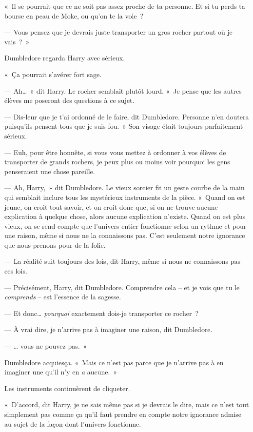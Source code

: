 «~Il se pourrait que ce ne soit pas assez proche de ta personne.
Et si tu perds ta bourse en peau de Moke, ou qu'on te la vole~?

--- Vous pensez que je devrais juste transporter un gros rocher partout où je vais~?~»

Dumbledore regarda Harry avec sérieux.

«~Ça pourrait s'avérer fort sage.

--- Ah…~» dit Harry.
Le rocher semblait plutôt lourd.
«~Je pense que les autres élèves me poseront des questions à ce sujet.

--- Dis-leur que je t'ai ordonné de le faire, dit Dumbledore.
Personne n'en doutera puisqu'ils pensent tous que je suis fou.~»
Son visage était toujours parfaitement sérieux.

--- Euh, pour être honnête, si vous vous mettez à ordonner à vos élèves de transporter de grands rochers, je peux plus ou moins voir pourquoi les gens penseraient une chose pareille.

--- Ah, Harry,~» dit Dumbledore.
Le vieux sorcier fit un geste courbe de la main qui semblait inclure tous les mystérieux instruments de la pièce.
«~Quand on est jeune, on croit tout savoir, et on croit donc que, si on ne trouve aucune explication à quelque chose, alors aucune explication n'existe.
Quand on est plus vieux, on se rend compte que l'univers entier fonctionne selon un rythme et pour une raison, même si nous ne la connaissons pas.
C'est seulement notre ignorance que nous prenons pour de la folie.

--- La réalité suit toujours des lois, dit Harry, même si nous ne connaissons pas ces lois.

--- Précisément, Harry, dit Dumbledore.
Comprendre cela -- et je vois que tu le \emph{comprends} -- est l'essence de la sagesse.

--- Et donc…
\emph{pourquoi} exactement dois-je transporter ce rocher~?

--- À vrai dire, je n'arrive pas à imaginer une raison, dit Dumbledore.

--- … vous ne pouvez pas.~»

Dumbledore acquiesça.
«~Mais ce n'est pas parce que je n'arrive pas à en imaginer une qu'il n'y en \emph{a} aucune.~»

Les instruments continuèrent de cliqueter.

«~D'accord, dit Harry, je ne sais même pas si je devrais le dire, mais ce n'est tout simplement pas comme ça qu'il faut prendre en compte notre ignorance admise au sujet de la façon dont l'univers fonctionne.

